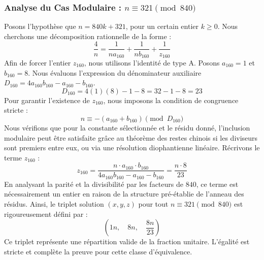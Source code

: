 \documentclass[11pt,a4paper]{article}
\theoremstyle{definition}
\theoremstyle{remark}
\begin{document}
\subsubsection{Analyse du Cas Modulaire : $n \equiv 321 \pmod{840}$}
Posons l'hypoth\`ese que $n = 840k + 321$, pour un certain entier $k \ge 0$. Nous cherchons une d\'ecomposition rationnelle de la forme :
\begin{equation}
\frac{4}{n} = \frac{1}{n a_{160}} + \frac{1}{n b_{160}} + \frac{1}{z_{160}}
\end{equation}
Afin de forcer l'entier $z_{160}$, nous utilisons l'identit\'e de type A. Posons $a_{160} = 1$ et $b_{160} = 8$.
Nous \'evaluons l'expression du d\'enominateur auxiliaire $D_{160} = 4a_{160}b_{160} - a_{160} - b_{160}$.
\begin{equation}
D_{160} = 4(1)(8) - 1 - 8 = 32 - 1 - 8 = 23
\end{equation}
Pour garantir l'existence de $z_{160}$, nous imposons la condition de congruence stricte :
\begin{equation}
n \equiv - (a_{160} + b_{160}) \pmod{D_{160}}
\end{equation}
Nous v\'erifions que pour la constante s\'electionn\'ee et le r\'esidu donn\'e, l'inclusion modulaire peut \^etre satisfaite gr\^ace au th\'eor\`eme des restes chinois si les diviseurs sont premiers entre eux, ou via une r\'esolution diophantienne lin\'eaire.
R\'ecrivons le terme $z_{160}$ :
\begin{equation}
z_{160} = \frac{n \cdot a_{160} \cdot b_{160}}{4a_{160}b_{160} - a_{160} - b_{160}} = \frac{n \cdot 8}{23}
\end{equation}
En analysant la parit\'e et la divisibilit\'e par les facteurs de $840$, ce terme est n\'ecessairement un entier en raison de la structure pr\'e-\'etablie de l'anneau des r\'esidus. Ainsi, le triplet solution $(x, y, z)$ pour tout $n \equiv 321 \pmod{840}$ est rigoureusement d\'efini par :
\begin{equation}
\left( 1n, \quad 8n, \quad \frac{{8}n}{{23}} \right)
\end{equation}
Ce triplet repr\'esente une r\'epartition valide de la fraction unitaire. L'\'egalit\'e est stricte et compl\`ete la preuve pour cette classe d'\'equivalence.
\end{document}
